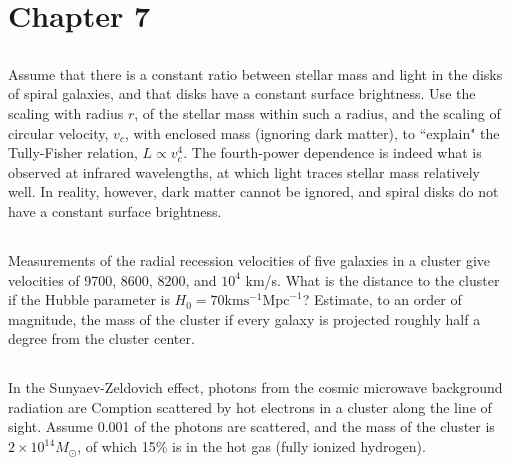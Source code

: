 \documentclass[12pt]{article}
\begin{document}
\newcommand{\mpc}{\mathrm{Mpc}\,}
\newcommand{\km}{\mathrm{km\,}}
\newcommand{\solarmass}{M_{\odot}}
\newcommand{\s}{\mathrm{s}\,}
\newcommand{\is}{\s^{-1}\,}
\newcommand{\ikm}{\km^{-1}\,}
\newcommand{\impc}{\mpc^{-1}\,}

\newcommand{\reh}{r_\mathrm{eh}}
\newcommand{\rh}{t_\mathrm{h}}
\newcommand{\el}{\varepsilon_\Lambda}

\setcounter{section}{7}

\section*{Chapter 7}

\subsection{} %

Assume that there is a constant ratio between stellar mass and light in the disks of spiral galaxies, and that disks have a constant surface brightness. Use the scaling with radius \(r\), of the stellar mass within such a radius, and the scaling of circular velocity, \(v_c\), with enclosed mass (ignoring dark matter), to ``explain" the Tully-Fisher relation, \(L \propto v_c^4\). The fourth-power dependence is indeed what is observed at infrared wavelengths, at which light traces stellar mass relatively well. In reality, however, dark matter cannot be ignored, and spiral disks do not have a constant surface brightness.

\subsection{} %

Measurements of the radial recession velocities of five galaxies in a cluster give velocities of 9700, 8600, 8200, and \(10^4\) km/s. What is the distance to the cluster if the Hubble parameter is \(H_0 = 70 \mathrm{km}\mathrm{s}^{-1}\mathrm{Mpc}^{-1}\)? Estimate, to an order of magnitude, the mass of the cluster if every galaxy is projected roughly half a degree from the cluster center.

\subsection{} %

In the Sunyaev-Zeldovich effect, photons from the cosmic microwave background radiation are Comption scattered by hot electrons in a cluster along the line of sight. Assume 0.001 of the photons are scattered, and the mass of the cluster is \(2 \times 10^{14} \solarmass\), of which 15\% is in the hot gas (fully ionized hydrogen).
\end{document}
